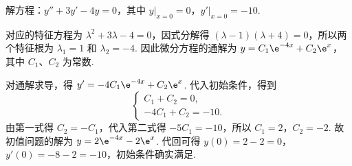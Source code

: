 \begin{problem}
解方程：\(y''+3y'-4y=0\)，其中 \(y\big|_{x=0}=0\)，\(y'\big|_{x=0}=-10\).
\end{problem}

\begin{solution}
对应的特征方程为 \(\lambda^2+3\lambda-4=0\)，因式分解得 \(\left(\lambda-1\right)\left(\lambda+4\right)=0\)，所以两个特征根为 \(\lambda_1=1\) 和 \(\lambda_2=-4\). 因此微分方程的通解为 \(y=C_1\e^{-4x}+C_2\e^x\)，其中 \(C_1\)、\(C_2\) 为常数.

对通解求导，得 \(y'=-4C_1\e^{-4x}+C_2\e^x\). 代入初始条件，得到
\[
\begin{cases}
C_1+C_2=0,\\
-4C_1+C_2=-10.
\end{cases}
\]
由第一式得 \(C_2=-C_1\)，代入第二式得 \(-5C_1=-10\)，所以 \(C_1=2\)，\(C_2=-2\). 故初值问题的解为 \(y=2\e^{-4x}-2\e^x\). 代回可得 \(y(0)=2-2=0\)，\(y'(0)=-8-2=-10\)，初始条件确实满足.
\end{solution}
